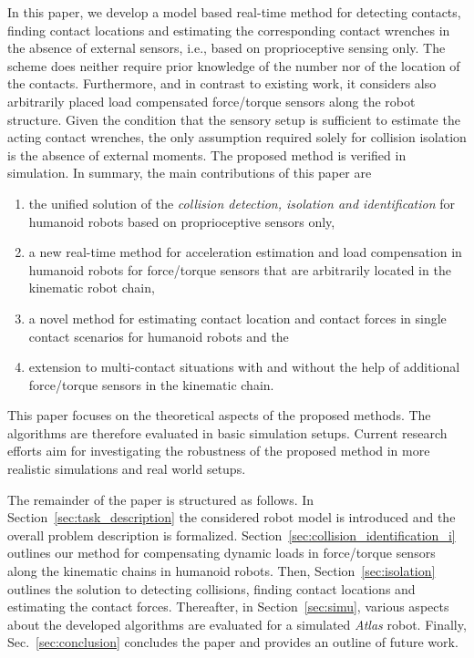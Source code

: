 In this paper, we develop a model based real-time method for detecting contacts, finding contact locations and estimating the corresponding contact wrenches in the absence of external sensors, i.e., based on proprioceptive sensing only.
The scheme does neither require prior knowledge of the number nor of the location of the contacts.
Furthermore, and in contrast to existing work, it considers also arbitrarily placed load compensated force/torque sensors along the robot structure.
Given the condition that the sensory setup is sufficient to estimate the acting contact wrenches, the only assumption required solely for collision isolation is the absence of external moments. 
The proposed method is verified in simulation. In summary, the main contributions of this paper are
%
\begin{enumerate}
\item the unified solution of the \emph{collision detection, isolation and identification} for humanoid robots based on proprioceptive sensors only,
\item a new real-time method for acceleration estimation and load compensation in humanoid robots for force/torque sensors that are arbitrarily located in the kinematic robot chain,
\item a novel method for estimating contact location and contact forces in single contact scenarios for humanoid robots and the
\item extension to multi-contact situations with and without the help of additional force/torque sensors in the kinematic chain.
\end{enumerate}
%
This paper focuses on the theoretical aspects of the proposed methods. The algorithms are therefore evaluated in basic simulation setups. 
Current research efforts aim for investigating the robustness of the proposed method in more realistic simulations and real world setups.

The remainder of the paper is structured as follows. 
In Section~\ref{sec:task_description} the considered robot model is introduced and the overall problem description is formalized. 
Section~\ref{sec:collision_identification_i} outlines our method for compensating dynamic loads in force/torque sensors along the kinematic chains in humanoid robots. 
Then, Section~\ref{sec:isolation} outlines the solution to detecting collisions, finding contact locations and estimating the contact forces. 
Thereafter, in Section~\ref{sec:simu}, various aspects about the developed algorithms are evaluated for a simulated \emph{{A}tlas} robot. 
Finally, Sec.~\ref{sec:conclusion} concludes the paper and provides an outline of future work.




